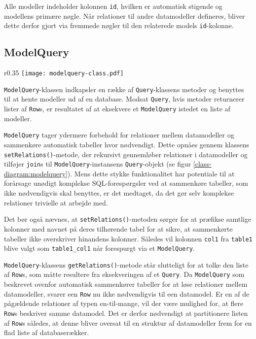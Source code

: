 Alle modeller indeholder kolonnen \texttt{id}, hvilken er automatisk stigende og modellens primære nøgle. Når relationer til andre datamodeller defineres, bliver dette derfor gjort via fremmede nøgler til den relaterede models \texttt{id}-kolonne.

\subsection{ModelQuery}

\begin{wrapfigure}{r}{0.35\textwidth}
  \centering
  \vspace{-12pt}
  \texttt{[image: modelquery-class.pdf]}
  \caption{Klassediagram for \texttt{ModelQuery}}
  \label{class-diagram:modelquery}
\end{wrapfigure}

\texttt{ModelQuery}-klassen indkapsler en række af \texttt{Query}-klassens metoder og benyttes til at hente modeller ud af en database. Modsat \texttt{Query}, hvis metoder returnerer lister af \texttt{Row}s, er resultatet af at eksekvere et \texttt{ModelQuery} istedet en liste af modeller.

\texttt{ModelQuery} tager ydermere forbehold for relationer mellem datamodeller og sammenkøre automatisk tabeller hvor nødvendigt. Dette opnåes gennem klassens \texttt{setRelations()}-metode, der rekursivt gennemløber relationer i datamodeller og tilføjer \texttt{join}s til \texttt{ModelQuery}-instansens \texttt{Query}-objekt (se figur \ref{class-diagram:modelquery}). Mens dette stykke funktionalitet har potentiale til at forårsage unødigt komplekse SQL-forespørgsler ved at sammenkøre tabeller, som ikke nødvendigvis skal benyttes, er det medtaget, da det gør selv komplekse relationer trivielle at arbejde med.

Det bør også nævnes, at \texttt{setRelations()}-metoden sørger for at præfikse samtlige kolonner med navnet på deres tilhørende tabel for at sikre, at sammenkørte tabeller ikke overskriver hinandens kolonner. Således vil kolonnen \texttt{col1} fra \texttt{table1} blive valgt som \texttt{table1\_col1} når forespurgt via et \texttt{ModelQuery}.

\texttt{ModelQuery}-klassens \texttt{getRelations()}-metode står slutteligt for at tolke den liste af \texttt{Row}s, som måtte resultere fra eksekveringen af et \texttt{Query}. Da \texttt{ModelQuery} som beskrevet ovenfor automatisk sammenkører tabeller for at løse relationer mellem datamodeller, svarer een \texttt{Row} nu ikke nødvendigvis til een datamodel. Er en af de pågældende relationer af typen en-til-mange, vil der være mulighed for, at flere \texttt{Row}s beskriver samme datamodel. Det er derfor nødvendigt at partitionere listen af \texttt{Row}s således, at denne bliver oversat til en struktur af datamodeller frem for en flad liste af databaserækker.

